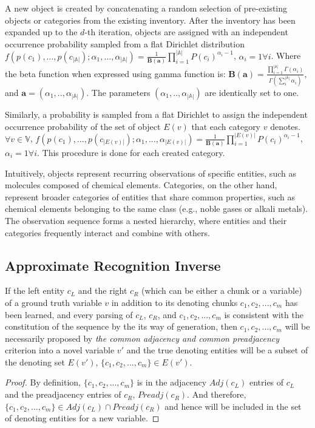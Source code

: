 \documentclass{article} %
\theoremstyle{remark}
\begin{document}
A new object is created by concatenating a random selection of pre-existing objects or categories from the existing inventory. After the inventory has been expanded up to the $d$-th iteration, objects are assigned with an independent occurrence probability sampled from a flat Dirichlet distribution $f(p(c_1),...,p(c_{|\mathbb{A}|});\alpha_1,...,\alpha_{|\mathbb{A}|}) = \frac{1}{\mathbf{B}(\mathbf{a})}\prod_{i = 1}^{|\mathbb{A}|} P(c_i)^{\alpha_i - 1}$, $\alpha_i = 1 \forall i $. Where the beta function when expressed using gamma function is: $\mathbf{B}(\mathbf{a}) = \frac{\prod_{i = 1}^{|\mathbb{A}|} \Gamma(\alpha_i)}{\Gamma(\sum_i^{|\mathbb{A}|}\alpha_i)}$, and $\mathbf{a} = (\alpha_1, .., \alpha_{|\mathbb{A}|})$. The parameters $(\alpha_1, .., \alpha_{|\mathbb{A}|})$ are identically set to one. 

Similarly, a probability is sampled from a flat Dirichlet to assign the independent occurrence probability of the set of object $E(v)$ that each category $v$ denotes. $\forall v \in \mathbb{V}$, $f(p(c_1),...,p(c_{|E(v)|});\alpha_1,...,\alpha_{|E(v)|}) = \frac{1}{\mathbf{B}(\mathbf{a})}\prod_{i = 1}^{|E(v)|} P(c_i)^{\alpha_i - 1}$, $\alpha_i = 1 \forall i $. This procedure is done for each created category. 

Intuitively, objects represent recurring observations of specific entities, such as molecules composed of chemical elements. Categories, on the other hand, represent broader categories of entities that share common properties, such as chemical elements belonging to the same class (e.g., noble gases or alkali metals). The observation sequence forms a nested hierarchy, where entities and their categories frequently interact and combine with others.

\subsection{Approximate Recognition Inverse}
\label{SI:recognition}
\begin{theorem}
If the left entity $c_L$ and the right $c_R$ (which can be either a chunk or a variable) of a ground truth variable $v$ in addition to its denoting chunks $c_1, c_2, ..., c_m$ has been learned, and every parsing of $c_L$, $c_R$, and $c_1, c_2, ..., c_m$ is consistent with the constitution of the sequence by the its way of generation, then $c_1, c_2, ..., c_m$ will be necessarily proposed by \textit{the common adjacency and common preadjacency} criterion into a novel variable $v'$ and the true denoting entities will be a subset of the denoting set $E(v')$, $\{c_1, c_2, ..., c_m\} \in E(v')$. 
\end{theorem}
\begin{proof}
By definition, $\{c_1, c_2, ..., c_m\}$ is in the adjacency $Adj(c_L)$ entries of $c_L$ and the preadjacency entries of $c_R$, $Preadj(c_R)$. 
And therefore, $\{c_1, c_2, ..., c_m\} \in Adj(c_L) \cap Preadj(c_R)$ and hence will be included in the set of denoting entities for a new variable.
\end{proof}
\end{document}
